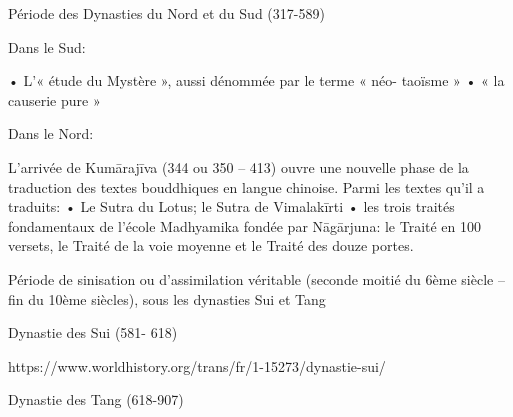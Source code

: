 Période des Dynasties du Nord et du Sud (317-589)
 
Dans le Sud:

•	L’« étude du Mystère », aussi dénommée par le terme « néo- taoïsme »
•	« la causerie pure »
 
Dans le Nord:

L’arrivée de Kumārajīva (344 ou 350 – 413) ouvre une nouvelle phase de la traduction des textes bouddhiques en langue chinoise.
Parmi les textes qu’il a traduits:
•	Le Sutra du Lotus; le Sutra de Vimalakīrti
•	les trois traités fondamentaux de l’école Madhyamika fondée par Nāgārjuna: le Traité en 100 versets, le Traité de la voie moyenne et le Traité des douze portes.
 

Période de sinisation ou d’assimilation véritable (seconde moitié du 6ème siècle – fin du 10ème siècles), sous les dynasties Sui et Tang
 




























Dynastie des Sui (581- 618)









https://www.worldhistory.org/trans/fr/1-15273/dynastie-sui/
 







Dynastie des Tang (618-907)
